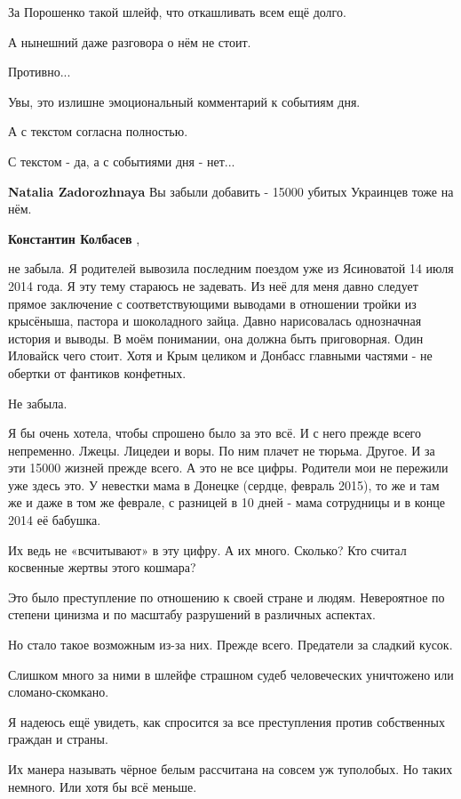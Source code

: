\begin{itemize}
За Порошенко такой шлейф, что откашливать всем ещё долго.

А нынешний даже разговора о нём не стоит.

Противно...

Увы, это излишне эмоциональный комментарий к событиям дня.

А с текстом согласна полностью.

С текстом - да, а с событиями дня - нет...

\begin{itemize} %
\textbf{Natalia Zadorozhnaya} Вы забыли добавить - 15000 убитых Украинцев тоже на нём.

\textbf{Константин Колбасев} , 

не забыла. Я родителей вывозила последним поездом уже из Ясиноватой 14 июля
2014 года. Я эту тему стараюсь не задевать. Из неё для меня давно следует
прямое заключение с соответствующими выводами в отношении тройки из крысёныша,
пастора и шоколадного зайца. Давно нарисовалась однозначная история и выводы. В
моём понимании, она должна быть приговорная. Один Иловайск чего стоит. Хотя и
Крым целиком и Донбасс главными частями - не обертки от фантиков конфетных.

Не забыла.

Я бы очень хотела, чтобы спрошено было за это всё. И с него прежде всего
непременно. Лжецы. Лицедеи и воры. По ним плачет не тюрьма. Другое. И за эти
15000 жизней прежде всего. А это не все цифры. Родители мои не пережили уже
здесь это. У невестки мама в Донецке (сердце, февраль 2015), то же и там же и
даже в том же феврале, с разницей в 10 дней - мама сотрудницы и в конце 2014 её
бабушка.

Их ведь не «всчитывают» в эту цифру. А их много. Сколько? Кто считал косвенные
жертвы этого кошмара?

Это было преступление по отношению к своей стране и людям. Невероятное по
степени цинизма и по масштабу разрушений в различных аспектах.

Но стало такое возможным из-за них. Прежде всего. Предатели за сладкий кусок.

Слишком много за ними в шлейфе страшном судеб человеческих уничтожено или
сломано-скомкано.

Я надеюсь ещё увидеть, как спросится за все преступления против собственных
граждан и страны.

Их манера называть чёрное белым рассчитана на совсем уж туполобых. Но таких
немного. Или хотя бы всё меньше.


\end{itemize}
\end{itemize}
